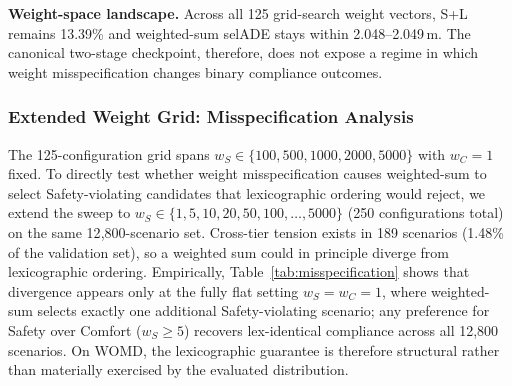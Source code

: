 \noindent\textbf{Weight-space landscape.}
Across all 125 grid-search weight vectors, S+L remains 13.39\% and weighted-sum selADE stays within 2.048--2.049\,m. The canonical two-stage checkpoint, therefore, does not expose a regime in which weight misspecification changes binary compliance outcomes.

\subsubsection{Extended Weight Grid: Misspecification Analysis}
\label{subsubsec:misspecification}

The 125-configuration grid spans $w_S \in \{100, 500, 1000, 2000, 5000\}$ with $w_C{=}1$ fixed.  To directly test whether weight misspecification causes weighted-sum to select Safety-violating candidates that lexicographic ordering would reject, we extend the sweep to $w_S \in \{1, 5, 10, 20, 50, 100, \ldots, 5000\}$ (250 configurations total) on the same 12{,}800-scenario set.  Cross-tier tension exists in 189 scenarios (1.48\% of the validation set), so a weighted sum could in principle diverge from lexicographic ordering.  Empirically, Table~\ref{tab:misspecification} shows that divergence appears only at the fully flat setting $w_S{=}w_C{=}1$, where weighted-sum selects exactly one additional Safety-violating scenario; any preference for Safety over Comfort ($w_S{\geq}5$) recovers lex-identical compliance across all 12{,}800 scenarios.  On WOMD, the lexicographic guarantee is therefore structural rather than materially exercised by the evaluated distribution.

